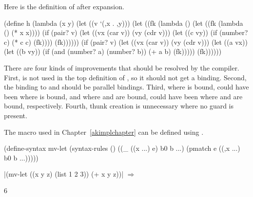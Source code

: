 Here is the definition of  after expansion.  
\schemedisplayspace
\begin{schemedisplay}
(define h
  (lambda (x y)
    (let ((v `(,x . ,y)))
      (let ((fk (lambda ()
                  (let ((fk (lambda () (* x x))))
                    (if (pair? v)
                      (let ((vx (car v)) (vy (cdr v)))
                        (let ((c vy))
                          (if (number? c) (* c c) (fk))))
                      (fk))))))
        (if (pair? v)
          (let ((vx (car v)) (vy (cdr v)))
            (let ((a vx))
              (let ((b vy))
                (if (and (number? a) (number? b))
                  (+ a b)
                  (fk)))))
          (fk))))))
\end{schemedisplay}

There are four kinds of improvements that should be resolved by the
compiler.  First,  is not used in the top definition of
, so it should not get a binding. Second, the binding to
 and  should be parallel  bindings.
Third, where  is bound, could have been where  is
bound, and where  and  are bound, could have been
where  and  are bound, respectively.  Fourth,
thunk creation is unnecessary where no guard is present.

The  macro used in Chapter~\ref{akimplchapter} can be defined using .
\schemedisplayspace
\begin{schemedisplay}
(define-syntax mv-let
  (syntax-rules () 
    ((_ ((x ...) e) b0 b ...) (pmatch e ((,x ...) b0 b ...)))))
\end{schemedisplay}

\noindent\scheme|(mv-let ((x y z) (list 1 2 3)) (+ x y z))| $\Rightarrow$ \begin{schemeresponsebox}6\end{schemeresponsebox}
